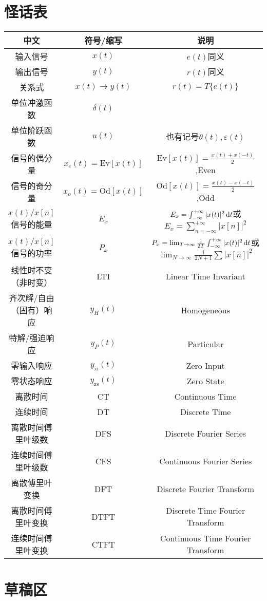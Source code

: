 \documentclass{article}
\newcommand\Ev[1]{\mathrm{Ev}\left[#1\right]}
\newcommand\Od[1]{\mathrm{Od}\left[#1\right]}
\newcommand\zi{\mathrm{zi}}
\newcommand\zs{\mathrm{zs}}
\begin{document}
\section{怪话表}
\begin{table}[H]
	\centering
	\begin{tabular}{ccc}
		\toprule
		中文 & 符号/缩写 & 说明 \\
		\midrule
		输入信号 & $x(t)$ & $e(t)$同义 \\
		输出信号 & $y(t)$ & $r(t)$同义 \\
		关系式 & $x(t)\longrightarrow y(t)$ & $r(t)=T\{e(t)\}$ \\
		单位冲激函数 & $\delta(t)$ &  \\
		单位阶跃函数 & $u(t)$ & 也有记号$\theta(t),\varepsilon(t)$ \\
		信号的偶分量 & $x_{e}(t)=\Ev{x(t)}$ & $\Ev{x(t)}=\frac{x(t)+x(-t)}{2}$,Even \\
		信号的奇分量 & $x_{o}(t)=\Od{x(t)}$ & $\Od{x(t)}=\frac{x(t)-x(-t)}{2}$,Odd \\
		$x(t)/x[n]$信号的能量 & $E_x$ & $E_x=\int_{-\infty}^{+\infty}|x(t)|^2\mathop{}\!\mathrm{d} t$或$E_x = \sum_{n=-\infty}^{+\infty}|x[n]|^2$ \\
		$x(t)/x[n]$信号的功率 & $P_x$ & $P_x = \lim_{T \to \infty}\frac{1}{2T}\int_{-\infty}^{+\infty}|x(t)|^2\mathop{}\!\mathrm{d} t$或$\lim_{N \to \infty}\frac{1}{2N+1}\sum|x[n]|^2$ \\
		线性时不变（非时变） & LTI & Linear Time Invariant \\
		齐次解/自由（固有）响应 & $y_{H}(t)$ & Homogeneous \\
		特解/强迫响应 & $y_{P}(t)$ & Particular \\
		零输入响应 & $y_{\zi}(t)$ & Zero Input \\
		零状态响应 & $y_{\zs}(t)$ & Zero State \\
		离散时间 & CT & Continuous Time \\
		连续时间 & DT & Discrete Time \\
		离散时间傅里叶级数 & DFS & Discrete Fourier Series \\
		连续时间傅里叶级数 & CFS & Continuous Fourier Series \\
		离散傅里叶变换 & DFT & Discrete Fourier Transform \\
		离散时间傅里叶变换 & DTFT & Discrete Time Fourier Transform \\
		连续时间傅里叶变换 & CTFT & Continuous Time Fourier Transform \\
		\bottomrule
	\end{tabular}
\end{table}

\section{草稿区}
\end{document}
